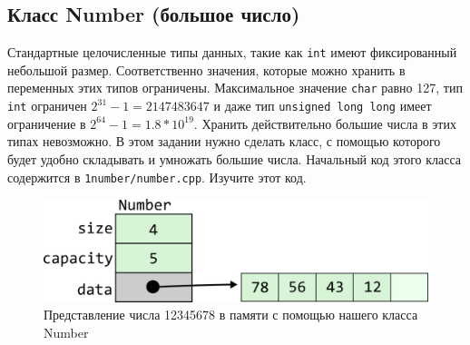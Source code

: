 \documentclass{article}
\begin{document}
\subsection*{Класс Number (большое число)}
Стандартные целочисленные  типы данных, такие как \texttt{int} имеют фиксированный небольшой размер. Соответственно значения, которые можно хранить в переменных этих типов ограничены. Максимальное значение \texttt{char} равно 127, тип \texttt{int} ограничен $2^{31}-1 = 2147483647$ и даже тип \texttt{unsigned long long} имеет ограничение в $2^{64}-1 = 1.8 * 10^{19}$. Хранить действительно большие числа в этих типах невозможно. В этом задании нужно сделать класс, с помощью которого будет удобно складывать и умножать большие числа. Начальный код этого класса содержится в \texttt{1number/number.cpp}. Изучите этот код.


\begin{figure}[h!]
  \centering
  \includegraphics[scale=1]{../images/number1.png}
  \caption{Представление числа 12345678 в памяти с помощью нашего класса Number}
  \label{fig:nummber1}
\end{figure}
\end{document}
